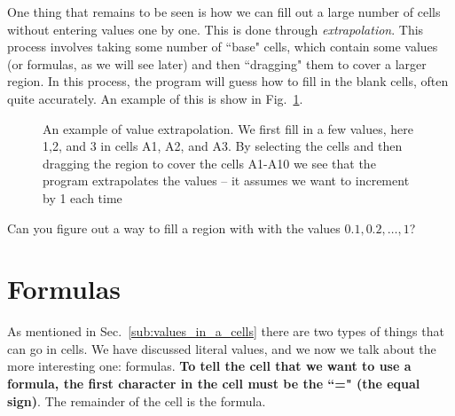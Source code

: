 \documentclass[10pt]{article}
\begin{document}
One thing that remains to be seen is how we can fill out a large number of cells without entering values one by one. 
This is done through \textit{extrapolation}.
This process involves taking some number of ``base" cells, which contain some values (or formulas, as we will see later) and then ``dragging" them to cover a larger region.
In this process, the program will guess how to fill in the blank cells, often quite accurately.
An example of this is show in Fig.~\ref{fig:extrapolation}.


\begin{figure}[htpb]
	\centering
	\begin{minipage}{0.5\textwidth}
	\begin{sheetpic}
	\end{sheetpic}
	\end{minipage}
	\begin{minipage}{0.3\textwidth}
	\begin{sheetpic}
		\etab[10]{A-B}	
		\fillCol{A}{1}{10}{\row}{c}
		\multiSelec{A-1}{A-10}
	\end{sheetpic}
\end{minipage}
	\caption{
	An example of value extrapolation.
	We first fill in a few values, here 1,2, and 3 in cells A1, A2, and A3.
	By selecting the cells and then dragging the region to cover the cells A1-A10 we see that the program extrapolates the values -- it assumes we want to increment by 1 each time}%
	\label{fig:extrapolation}
\end{figure}

\begin{exercise}
	Can you figure out a way to fill a region with with the values $0.1,0.2, \ldots, 1$?
\end{exercise}



\section{Formulas}%
\label{sec:formulas}

As mentioned in Sec.~\ref{sub:values_in_a_cells} there are two types of things that can go in cells. 
We have discussed literal values, and we now we talk about the more interesting one: formulas. \textbf{To tell the cell that we want to use a formula, the first character in the cell must be the ``=" (the equal sign)}.
The remainder of the cell is the formula. 
\end{document}
